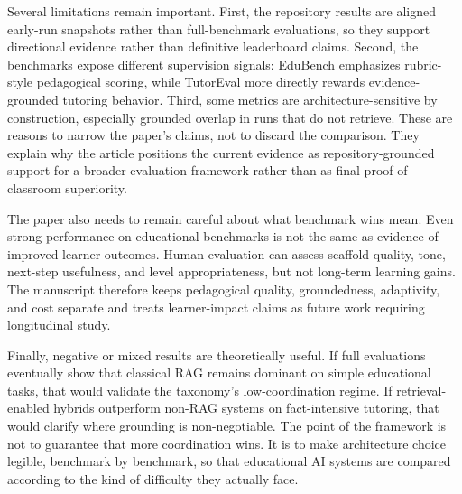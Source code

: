 Several limitations remain important. First, the repository results are aligned early-run snapshots rather than full-benchmark evaluations, so they support directional evidence rather than definitive leaderboard claims. Second, the benchmarks expose different supervision signals: EduBench emphasizes rubric-style pedagogical scoring, while TutorEval more directly rewards evidence-grounded tutoring behavior. Third, some metrics are architecture-sensitive by construction, especially grounded overlap in runs that do not retrieve. These are reasons to narrow the paper's claims, not to discard the comparison. They explain why the article positions the current evidence as repository-grounded support for a broader evaluation framework rather than as final proof of classroom superiority.

The paper also needs to remain careful about what benchmark wins mean. Even strong performance on educational benchmarks is not the same as evidence of improved learner outcomes. Human evaluation can assess scaffold quality, tone, next-step usefulness, and level appropriateness, but not long-term learning gains. The manuscript therefore keeps pedagogical quality, groundedness, adaptivity, and cost separate and treats learner-impact claims as future work requiring longitudinal study.

Finally, negative or mixed results are theoretically useful. If full evaluations eventually show that classical RAG remains dominant on simple educational tasks, that would validate the taxonomy's low-coordination regime. If retrieval-enabled hybrids outperform non-RAG systems on fact-intensive tutoring, that would clarify where grounding is non-negotiable. The point of the framework is not to guarantee that more coordination wins. It is to make architecture choice legible, benchmark by benchmark, so that educational AI systems are compared according to the kind of difficulty they actually face.
